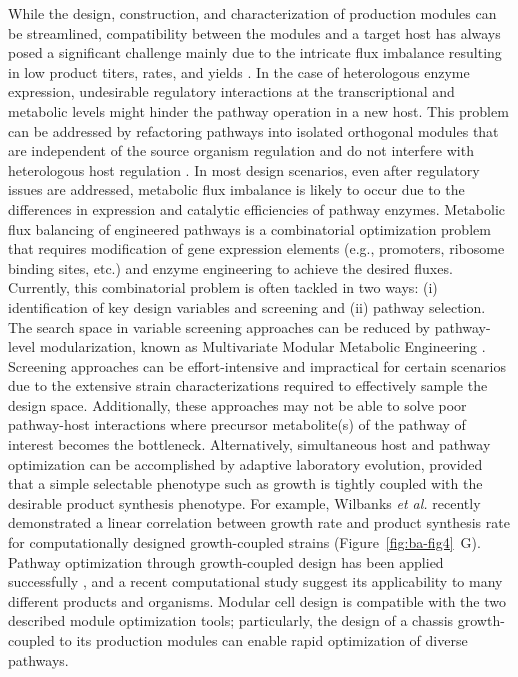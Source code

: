 While the design, construction, and characterization of production modules can be streamlined, compatibility between the modules and a target host has always posed a significant challenge mainly due to the intricate flux imbalance resulting in low product titers, rates, and yields \citep{nielsen2016}.
In the case of heterologous enzyme expression, undesirable regulatory interactions at the transcriptional and metabolic levels might hinder the pathway operation in a new host.
This problem can be addressed by refactoring pathways into isolated orthogonal modules that are independent of the source organism regulation and do not interfere with heterologous host regulation \citep{galanie2015, RN171, tan2017, temme2012}.
In most design scenarios, even after regulatory issues are addressed, metabolic flux imbalance is likely to occur due to the differences in expression and catalytic efficiencies of pathway enzymes.
Metabolic flux balancing of engineered pathways is a combinatorial optimization problem that requires modification of gene expression elements (e.g., promoters, ribosome binding sites, etc.) and enzyme engineering to achieve the desired fluxes.
Currently, this combinatorial problem is often tackled in two ways: (i) identification of key design variables and screening and (ii) pathway selection.
The search space in variable screening approaches can be reduced by pathway-level modularization, known as Multivariate Modular Metabolic Engineering \citep{biggs2014, jeschek2017, yadav2012}.
Screening approaches can be effort-intensive and impractical for certain scenarios due to the extensive strain characterizations required to effectively sample the design space.
Additionally, these approaches may not be able to solve poor pathway-host interactions where precursor metabolite(s) of the pathway of interest becomes the bottleneck.
Alternatively, simultaneous host and pathway optimization can be accomplished by adaptive laboratory evolution, provided that a simple selectable phenotype such as growth is tightly coupled with the desirable product synthesis phenotype.
For example, Wilbanks \emph{et al.} \citep{wilbanks2017} recently demonstrated a linear correlation between growth rate and product synthesis rate for computationally designed growth-coupled strains \citep{trinh2015} (Figure~\ref{fig:ba-fig4}~G).
Pathway optimization through growth-coupled design has been applied successfully \citep{fong2005}, and a recent computational study suggest its applicability to many different products and organisms. \citep{von2017}
Modular cell design is compatible with the two described module optimization tools; particularly, the design of a chassis growth-coupled to its production modules can enable rapid optimization of diverse pathways.

